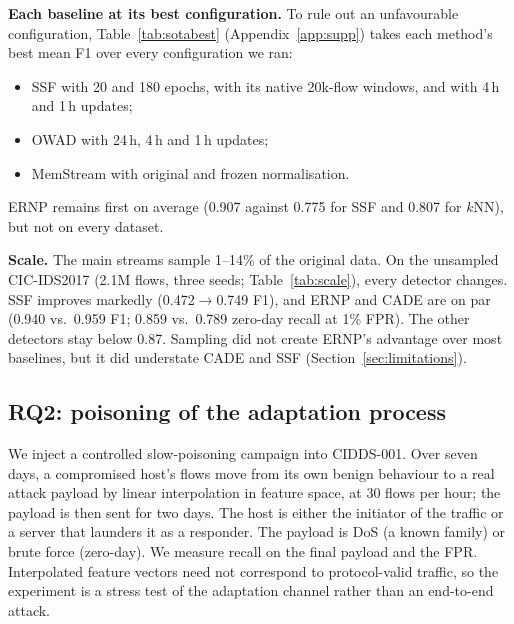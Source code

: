 \documentclass[a4paper,fleqn]{cas-dc}
\newcommand{\ERNP}{ERNP\xspace}
\begin{document}
\textbf{Each baseline at its best configuration.} To rule out an unfavourable configuration, Table~\ref{tab:sotabest} (Appendix~\ref{app:supp}) takes each method's best mean F1 over every configuration we ran:
\begin{itemize}
  \item SSF with 20 and 180 epochs, with its native 20k-flow windows, and with 4\,h and 1\,h updates;
  \item OWAD with 24\,h, 4\,h and 1\,h updates;
  \item MemStream with original and frozen normalisation.
\end{itemize}
\ERNP remains first on average (0.907 against 0.775 for SSF and 0.807 for $k$NN), but not on every dataset.

\textbf{Scale.} The main streams sample 1--14\% of the original data. On the unsampled CIC-IDS2017 (2.1M flows, three seeds; Table~\ref{tab:scale}), every detector changes. SSF improves markedly (0.472$\rightarrow$0.749 F1), and \ERNP and CADE are on par (0.940 vs.\ 0.959 F1; 0.859 vs.\ 0.789 zero-day recall at 1\% FPR). The other detectors stay below 0.87. Sampling did not create \ERNP's advantage over most baselines, but it did understate CADE and SSF (Section~\ref{sec:limitations}).

\begin{table}[t]
\centering
\caption{Left: unsampled CIC-IDS2017 (three seeds). Right: cost on the sampled streams, one job at a time on a 12-core CPU and an RTX~3050 (mean over CIDDS-001, ToN and CSE-CIC-IDS2018). An \ERNP refit per period takes 3--55\,s.}
\label{tab:scale}
\scriptsize

\end{table}

\subsection{RQ2: poisoning of the adaptation process}
\label{sec:rq2}
We inject a controlled slow-poisoning campaign into CIDDS-001. Over seven days, a compromised host's flows move from its own benign behaviour to a real attack payload by linear interpolation in feature space, at 30 flows per hour; the payload is then sent for two days. The host is either the initiator of the traffic or a server that launders it as a responder. The payload is DoS (a known family) or brute force (zero-day). We measure recall on the final payload and the FPR. Interpolated feature vectors need not correspond to protocol-valid traffic, so the experiment is a stress test of the adaptation channel rather than an end-to-end attack.
\end{document}
